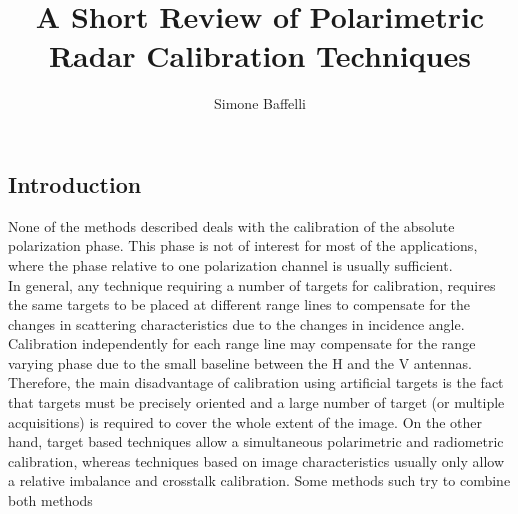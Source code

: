 \documentclass[11pt]{article}
\title{\textbf{A Short Review of Polarimetric Radar Calibration Techniques}}
\author{Simone Baffelli}
\date{}
\begin{document}
\maketitle
\subsection{Introduction}
None of the methods described deals with the calibration of the absolute polarization phase. This phase is not of interest for most of the applications, where the phase relative to one polarization channel is usually sufficient.\\
In general, any technique requiring a number of targets for calibration, requires the same targets to be placed at different range lines to compensate for the changes in scattering characteristics due to the changes in incidence angle. Calibration independently for each range line may compensate for the range varying phase due to the small baseline between the H and the V antennas\cite{1610834}.
Therefore, the main disadvantage of calibration using artificial targets is the fact that targets must be precisely oriented and a large number of target (or multiple acquisitions) is required to cover the whole extent of the image. On the other hand, target based techniques allow a simultaneous polarimetric and radiometric calibration, whereas techniques based on image characteristics usually only allow a relative imbalance and crosstalk calibration. Some methods such\cite{VanZyl1990,Klein1992} try to combine both methods 
\end{document}
